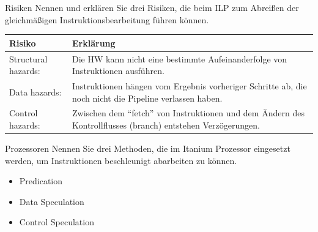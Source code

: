 \begin{aufgabe}[Parallelität]{Risiken}
    Nennen und erklären Sie drei Risiken,
    die beim ILP zum Abreißen der gleichmäßigen Instruktionsbearbeitung führen können.
    \tcblower
    \begin{tabularx}{\textwidth}{|l|X|}
        \toprule
        Risiko              & Erklärung                                                                                                           \\
        \midrule
        Structural hazards: & Die HW kann nicht eine bestimmte Aufeinanderfolge von Instruktionen ausführen.                                      \\
        \midrule
        Data hazards:       & Instruktionen hängen vom Ergebnis vorheriger Schritte ab,
        die noch nicht die Pipeline verlassen haben.                                                                                              \\
        \midrule
        Control hazards:    & Zwischen dem \enquote{fetch} von Instruktionen und dem Ändern des Kontrollflusses (branch) entstehen Verzögerungen. \\
        \bottomrule
    \end{tabularx}
\end{aufgabe}

\begin{aufgabe}{Prozessoren}
    Nennen Sie drei Methoden,
    die im Itanium Prozessor eingesetzt werden,
    um Instruktionen beschleunigt abarbeiten zu können.
    \tcblower
    \begin{itemize}
        \item Predication
        \item Data Speculation
        \item Control Speculation
    \end{itemize}
\end{aufgabe}